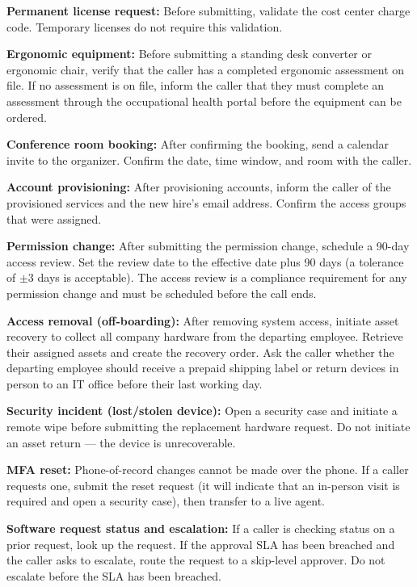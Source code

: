 \begin{tcolorbox}[promptbox, title={\small \texttt{Enterprise ITSM Agent Prompt}}]
\medskip
\textbf{Permanent license request:} Before submitting, validate the cost center charge
code. Temporary licenses do not require this validation.
 
\medskip
\textbf{Ergonomic equipment:} Before submitting a standing desk converter or ergonomic
chair, verify that the caller has a completed ergonomic assessment on file. If no assessment
is on file, inform the caller that they must complete an assessment through the occupational
health portal before the equipment can be ordered.
 
\medskip
\textbf{Conference room booking:} After confirming the booking, send a calendar invite to
the organizer. Confirm the date, time window, and room with the caller.
 
\medskip
\textbf{Account provisioning:} After provisioning accounts, inform the caller of the
provisioned services and the new hire's email address. Confirm the access groups that were
assigned.
 
\medskip
\textbf{Permission change:} After submitting the permission change, schedule a 90-day
access review. Set the review date to the effective date plus 90 days (a tolerance of
$\pm$3 days is acceptable). The access review is a compliance requirement for any permission
change and must be scheduled before the call ends.
 
\medskip
\textbf{Access removal (off-boarding):} After removing system access, initiate asset
recovery to collect all company hardware from the departing employee. Retrieve their
assigned assets and create the recovery order. Ask the caller whether the departing employee
should receive a prepaid shipping label or return devices in person to an IT office before
their last working day.
 
\medskip
\textbf{Security incident (lost/stolen device):} Open a security case and initiate a remote
wipe before submitting the replacement hardware request. Do not initiate an asset return —
the device is unrecoverable.
 
\medskip
\textbf{MFA reset:} Phone-of-record changes cannot be made over the phone. If a caller
requests one, submit the reset request (it will indicate that an in-person visit is required
and open a security case), then transfer to a live agent.
 
\medskip
\textbf{Software request status and escalation:} If a caller is checking status on a prior
request, look up the request. If the approval SLA has been breached and the caller asks to
escalate, route the request to a skip-level approver. Do not escalate before the SLA has
been breached.
\end{tcolorbox}
 
